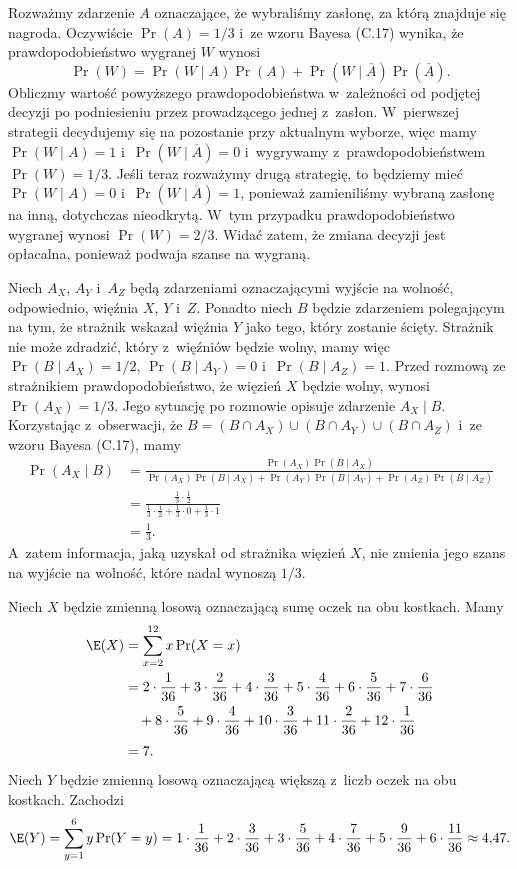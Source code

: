 \exercise %
Rozważmy zdarzenie $A$ oznaczające, że wybraliśmy zasłonę, za którą znajduje się nagroda.
Oczywiście $\Pr(A)=1/3$ i~ze wzoru Bayesa (C.17) wynika, że prawdopodobieństwo wygranej $W$ wynosi
\[
	\Pr(W) = \Pr(W\mid A)\Pr(A)+\Pr(W\mid\overline{A})\Pr(\overline{A}).
\]
Obliczmy wartość powyższego prawdopodobieństwa w~zależności od podjętej decyzji po podniesieniu przez prowadzącego jednej z~zasłon.
W~pierwszej strategii decydujemy się na pozostanie przy aktualnym wyborze, więc mamy $\Pr(W\mid A)=1$ i~$\Pr(W\mid\overline{A})=0$ i~wygrywamy z~prawdopodobieństwem $\Pr(W)=1/3$.
Jeśli teraz rozważymy drugą strategię, to będziemy mieć $\Pr(W\mid A)=0$ i~$\Pr(W\mid\overline{A})=1$, ponieważ zamieniliśmy wybraną zasłonę na inną, dotychczas nieodkrytą.
W~tym przypadku prawdopodobieństwo wygranej wynosi $\Pr(W)=2/3$.
Widać zatem, że zmiana decyzji jest opłacalna, ponieważ podwaja szanse na wygraną.

\exercise %
Niech $A_X$, $A_Y$ i~$A_Z$ będą zdarzeniami oznaczającymi wyjście na wolność, odpowiednio, więźnia $X$, $Y$ i~$Z$.
Ponadto niech $B$ będzie zdarzeniem polegającym na tym, że strażnik wskazał więźnia $Y$ jako tego, który zostanie ścięty.
Strażnik nie może zdradzić, który z~więźniów będzie wolny, mamy więc $\Pr(B\mid A_X)=1/2$, $\Pr(B\mid A_Y)=0$ i~$\Pr(B\mid A_Z)=1$.
Przed rozmową ze strażnikiem prawdopodobieństwo, że więzień $X$ będzie wolny, wynosi $\Pr(A_X)=1/3$.
Jego sytuację po rozmowie opisuje zdarzenie $A_X\mid B$.
Korzystając z~obserwacji, że $B=(B\cap A_X)\cup(B\cap A_Y)\cup(B\cap A_Z)$ i~ze wzoru Bayesa (C.17), mamy
\begin{align*}
    \Pr(A_X\mid B) &= \frac{\Pr(A_X)\Pr(B\mid A_X)}{\Pr(A_X)\Pr(B\mid A_X)+\Pr(A_Y)\Pr(B\mid A_Y)+\Pr(A_Z)\Pr(B\mid A_Z)} \\
	&= \frac{\frac{1}{3}\cdot\frac{1}{2}}{\frac{1}{3}\cdot\frac{1}{2}+\frac{1}{3}\cdot0+\frac{1}{3}\cdot1} \\[2mm]
	&= \frac{1}{3}.
\end{align*}
A~zatem informacja, jaką uzyskał od strażnika więzień $X$, nie zmienia jego szans na wyjście na wolność, które nadal wynoszą $1/3$.


\exercise %
Niech $X$ będzie zmienną losową oznaczającą sumę oczek na obu kostkach.
Mamy
\begin{align*}
	\E(X) &= \sum_{x=2}^{12}x\Pr(X=x) \\
	&= 2\cdot\frac{1}{36}+3\cdot\frac{2}{36}+4\cdot\frac{3}{36}+5\cdot\frac{4}{36}+6\cdot\frac{5}{36}+7\cdot\frac{6}{36} \\
	&\quad {}+8\cdot\frac{5}{36}+9\cdot\frac{4}{36}+10\cdot\frac{3}{36}+11\cdot\frac{2}{36}+12\cdot\frac{1}{36} \\[1mm]
	&= 7.
\end{align*}
Niech $Y$ będzie zmienną losową oznaczającą większą z~liczb oczek na obu kostkach.
Zachodzi
\[
	\E(Y) = \sum_{y=1}^{6}y\Pr(Y=y) = 1\cdot\frac{1}{36}+2\cdot\frac{3}{36}+3\cdot\frac{5}{36}+4\cdot\frac{7}{36}+5\cdot\frac{9}{36}+6\cdot\frac{11}{36} \approx 4{,}47.
\]

